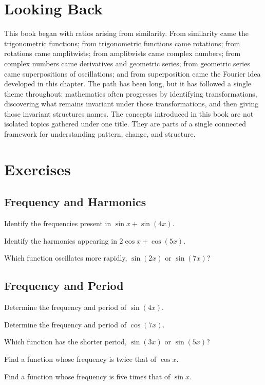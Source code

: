 \section{Looking Back}

This book began with ratios arising from similarity. From similarity
came the trigonometric functions; from trigonometric functions came
rotations; from rotations came amplitwists; from amplitwists came
complex numbers; from complex numbers came derivatives and geometric
series; from geometric series came superpositions of oscillations; and
from superposition came the Fourier idea developed in this chapter. The
path has been long, but it has followed a single theme throughout:
mathematics often progresses by identifying transformations, discovering
what remains invariant under those transformations, and then giving
those invariant structures names. The concepts introduced in this book
are not isolated topics gathered under one title. They are parts of a
single connected framework for understanding pattern, change, and
structure.

\section{Exercises}

\subsection*{Frequency and Harmonics}
\begin{exercise}
Identify the frequencies present in $\sin x + \sin(4x)$.
\end{exercise}
\begin{exercise}
Identify the harmonics appearing in $2\cos x + \cos(5x)$.
\end{exercise}
\begin{exercise}
Which function oscillates more rapidly, $\sin(2x)$ or $\sin(7x)$?
\end{exercise}

\subsection*{Frequency and Period}
\begin{exercise}
Determine the frequency and period of $\sin(4x)$.
\end{exercise}
\begin{exercise}
Determine the frequency and period of $\cos(7x)$.
\end{exercise}
\begin{exercise}
Which function has the shorter period, $\sin(3x)$ or $\sin(5x)$?
\end{exercise}
\begin{exercise}
Find a function whose frequency is twice that of $\cos x$.
\end{exercise}
\begin{exercise}
Find a function whose frequency is five times that of $\sin x$.
\end{exercise}

